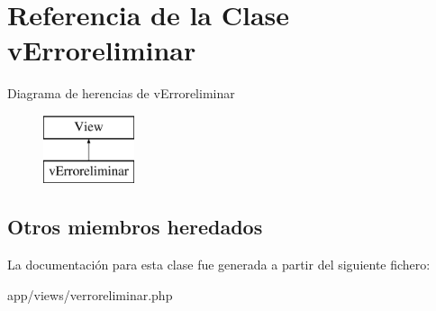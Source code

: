 \hypertarget{classv_erroreliminar}{}\section{Referencia de la Clase v\+Erroreliminar}
\label{classv_erroreliminar}
Diagrama de herencias de v\+Erroreliminar\begin{figure}[H]
\begin{center}
\leavevmode
\includegraphics[height=2.000000cm]{classv_erroreliminar}
\end{center}
\end{figure}
\subsection*{Otros miembros heredados}


La documentación para esta clase fue generada a partir del siguiente fichero\+:\begin{DoxyCompactItemize}
\item 
app/views/verroreliminar.\+php\end{DoxyCompactItemize}
